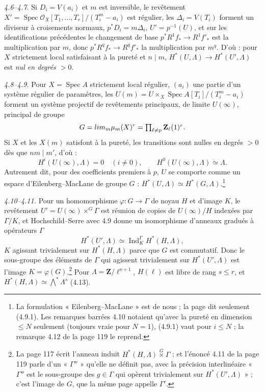 \documentclass[11pt,a4paper]{article}
\begin{document}
\emph{4.6--4.7.} Si $D_i = V(a_i)$ et $m$ est inversible, le revêtement
$X' = \operatorname{Spec}\mathcal{O}_X[T_1, \ldots, T_r]/(T_i^m - a_i)$ est
régulier, les $\Delta_i = V(T_i)$ forment un diviseur à croisements normaux,
$p^*D_i = m\Delta_i$, $U' = p^{-1}(U)$, et sur les identifications
précédentes le changement de base $p^*R^1 f_* \to R^1 f'_*$ est la multiplication
par $m$, donc $p^* R^q f_* \to R^q f'_*$ la multiplication par $m^q$. D'où : pour
$X$ strictement local satisfaisant à la pureté et $n \mid m$,
$H^*(U, \Lambda) \to H^*(U', \Lambda)$ est \emph{nul en degrés $> 0$}.

\emph{4.8--4.9.} Pour $X = \operatorname{Spec} A$ strictement local régulier,
$(a_i)$ une partie d'un système régulier de paramètres, les
$U(m) = U \times_X \operatorname{Spec} A[T_i]/(T_i^m - a_i)$ forment un système
projectif de revêtements principaux, de limite $U(\infty)$, principal de groupe
\[
  G = \varprojlim_m \mu_m(X)^r = \textstyle\prod_{\ell \neq p} \mathbf{Z}_\ell(1)^r .
\]
Si $X$ et les $X(m)$ satisfont à la pureté, les transitions sont nulles en degrés
$>0$ dès que $nm \mid m'$, d'où :
\[
  H^i(U(\infty), \Lambda) = 0 \quad (i \neq 0), \qquad H^0(U(\infty), \Lambda) \simeq \Lambda .
\]
Autrement dit, pour des coefficients premiers à $p$, $U$ se comporte comme un
espace d'Eilenberg--MacLane de groupe $G$ : $H^*(U, \Lambda) \simeq
H^*(G, \Lambda)$.\footnote{La formulation « Eilenberg--MacLane » est de nous ; la
page dit seulement (4.9.1). Les remarques barrées 4.10 notaient qu'avec la pureté
en dimension $\leq N$ seulement (toujours vraie pour $N = 1$), (4.9.1) vaut
pour $i \leq N$ ; la remarque 4.12 de la page 119 le reprend.}

\emph{4.10--4.11.} Pour un homomorphisme $\varphi : G \to \Gamma$ de noyau $H$ et
d'image $K$, le revêtement $U' = U(\infty) \times^G \Gamma$ est réunion de copies
de $U(\infty)/H$ indexées par $\Gamma/K$, et Hochschild--Serre avec 4.9 donne
un isomorphisme d'anneaux gradués à opérateurs $\Gamma$
\[
  H^*(U', \Lambda) \simeq \operatorname{Ind}_K^\Gamma H^*(H, \Lambda),
\]
$K$ agissant trivialement sur $H^*(H, \Lambda)$ parce que $G$ est commutatif.
Donc le sous-groupe des éléments de $\Gamma$ qui agissent trivialement sur
$H^*(U', \Lambda)$ est l'image $K = \varphi(G)$.\footnote{La page 117 écrit
l'anneau induit $H^*(H,\Lambda) \overset{G}{\times} \Gamma$ ; et l'énoncé 4.11
de la page 119 parle d'un « $\Gamma''$ » qu'elle ne définit pas, avec la
précision interlinéaire « $\Gamma''$ est le sous-groupe des $g \in \Gamma$ qui
opèrent trivialement sur $H^*(U', \Lambda)$ » ; c'est l'image de $G$, que la même
page appelle $\Gamma'$.} Pour $\Lambda = \mathbf{Z}/\ell^{\nu+1}$, $H(\ell)$ est
libre de rang $s \leq r$, et $H^*(H, \Lambda) \simeq \bigwedge^* \Lambda^s$
(4.13).
\end{document}
